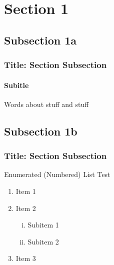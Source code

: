 



\section{Section 1}\label{Sec1}





\subsection{Subsection 1a}\label{Sub1a}



\begin{frame}
\frametitle{Title: Section \thesection Subsection \thesubsection}
\framesubtitle{Subitle}
Words about stuff and stuff
\end{frame}

\subsection{Subsection 1b}

\begin{frame} \frametitle{Title: Section \thesection Subsection \thesubsection}

Enumerated (Numbered) List Test
\begin{enumerate}
    \item Item 1
    \item Item 2
    \begin{enumerate}[i)] %
        \item Subitem 1
        \item Subitem 2
    \end{enumerate}
    \item Item 3
\end{enumerate}
\end{frame}

